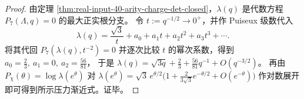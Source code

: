 \begin{proof}
由定理 \ref{thm:real-input-40-arity-charge-det-closed}，$\lambda(q)$ 是代数方程 $P_7(\Lambda,q)=0$ 的最大正实根分支。
令 $t:=q^{-1/2}\to 0^+$，并作 Puiseux 级数代入
\[
\lambda(q)=\frac{\sqrt3}{t}+a_0+a_1t+a_2t^2+a_3t^3+\cdots.
\]
将其代回 $P_7(\lambda(q),t^{-2})=0$ 并逐次比较 $t$ 的幂次系数，得到 $a_0=\frac23,\ a_1=0,\ a_2=\frac{56}{81}$，
于是 $\lambda(q)=\sqrt{3q}+\frac23+\frac{56}{81}q^{-1}+O(q^{-3/2})$。
再由
\(
P_\chi(\theta)=\log\lambda(e^\theta)
\)
对 $\lambda(e^\theta)=\sqrt{3}\,e^{\theta/2}\bigl(1+\frac{2}{3\sqrt3}e^{-\theta/2}+O(e^{-\theta})\bigr)$ 作对数展开即可得到所示压力渐近式。证毕。
\end{proof}
